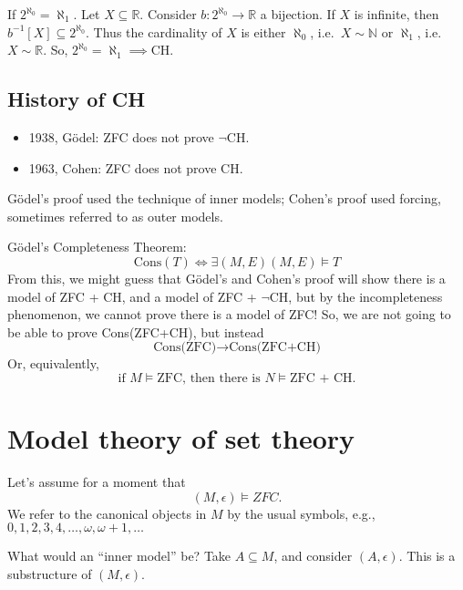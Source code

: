 \documentclass{article}
\begin{document}
If $2^{\aleph_0} = \aleph_1$.
Let $X \subseteq \mathbb{R}$. Consider $b: 2^{\aleph_0} \to \mathbb{R}$ a bijection. If $X$ is infinite, then $b^{-1}[X] \subseteq 2^{\aleph_0}$.
Thus the cardinality of $X$ is either $\aleph_0$, i.e.\ $X \sim \mathbb{N}$ or $\aleph_1$, i.e.\ $X \sim \mathbb{R}$.
So, $2^{\aleph_0} = \aleph_1 \implies \text{CH}$.

\subsection{History of CH}
\begin{itemize}[label=--]
  \item 1938, G\"odel: ZFC does not prove $\neg$CH.
  \item 1963, Cohen: ZFC does not prove CH.
\end{itemize}
G\"odel's proof used the technique of inner models; Cohen's proof used forcing, sometimes referred to as outer models.

G\"odel's Completeness Theorem:
\begin{equation*}
  \text{Cons}(T) \iff \exists(M, E) (M, E) \models T
\end{equation*}
From this, we might guess that G\"odel's and Cohen's proof will show there is a model of ZFC + CH, and a model of ZFC + $\neg$CH, but by the incompleteness phenomenon, we cannot prove there is a model of ZFC!
So, we are not going to be able to prove Cons(ZFC+CH), but instead
\begin{equation*}
  \text{Cons(ZFC)} \rightarrow \text{Cons(ZFC+CH)}
\end{equation*}
Or, equivalently,
\begin{equation*}
  \text{if } M \models \text{ZFC, then there is } N \models \text{ZFC + CH}.
\end{equation*}

\clearpage
\section{Model theory of set theory}
Let's assume for a moment that
\begin{equation*}
  (M,\epsilon) \models ZFC.
\end{equation*}
We refer to the canonical objects in $M$ by the usual symbols, e.g., $0,1,2,3,4,\dotsc, \omega, \omega+1, \dotsc$

What would an ``inner model'' be?
Take $A \subseteq M$, and consider $(A, \epsilon)$. This is a substructure of $(M, \epsilon)$.
\end{document}
